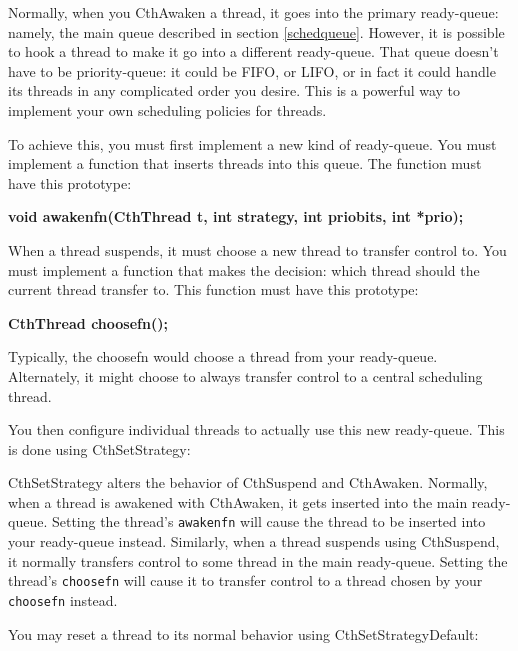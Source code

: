 Normally, when you CthAwaken a thread, it goes into the primary
ready-queue: namely, the main \converse{} queue described in section
\ref{schedqueue}.  However, it is possible to hook a thread to make
it go into a different ready-queue.  That queue doesn't have to be
priority-queue: it could be FIFO, or LIFO, or in fact it could handle
its threads in any complicated order you desire.  This is a powerful
way to implement your own scheduling policies for threads.

To achieve this, you must first implement a new kind of ready-queue.
You must implement a function that inserts threads into this queue.
The function must have this prototype:

{\bf void awakenfn(CthThread t, int strategy, int priobits, int *prio);}

When a thread suspends, it must choose a new thread to transfer control
to.  You must implement a function that makes the decision: which thread
should the current thread transfer to.  This function must have this
prototype:

{\bf CthThread choosefn();}

Typically, the choosefn would choose a thread from your ready-queue.
Alternately, it might choose to always transfer control to a central
scheduling thread.

You then configure individual threads to actually use this new
ready-queue.  This is done using CthSetStrategy:


CthSetStrategy alters the behavior of CthSuspend and CthAwaken.
Normally, when a thread is awakened with CthAwaken, it gets inserted
into the main ready-queue.  Setting the thread's {\tt awakenfn} will
cause the thread to be inserted into your ready-queue instead.
Similarly, when a thread suspends using CthSuspend, it normally
transfers control to some thread in the main ready-queue.  Setting the
thread's {\tt choosefn} will cause it to transfer control to a thread
chosen by your {\tt choosefn} instead.

You may reset a thread to its normal behavior using CthSetStrategyDefault:


